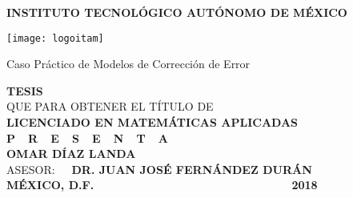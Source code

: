 \begin{titlepage}
    \begin{center}
        
        \vspace{0.2cm}

        \large
        \textbf{INSTITUTO TECNOL\'OGICO AUT\'ONOMO DE M\'EXICO}

        \vspace{1.2cm}
        
        \texttt{[image: logoitam]}
        
        \vspace{0.8cm}
        \LARGE
        Caso Práctico de Modelos de Corrección de Error
        
        \vspace{1.1cm}
        
        \normalsize \textbf{TESIS}\\ QUE PARA OBTENER EL T\'ITULO DE\\ \textbf{LICENCIADO EN MATEM\'ATICAS APLICADAS}\\[0.8cm]
        \normalsize \textbf{P\ \  R\ \  E\ \  S\ \  E\ \  N\ \  T\ \  A}\\[0.8cm]

        \textbf{OMAR D\'IAZ LANDA}\\[1.0cm]

        \normalsize ASESOR: \textbf{\ \ DR. JUAN JOSÉ FERN\'ANDEZ DUR\'AN}\\[1.0cm]

        \normalsize \textbf{M\'EXICO, D.F.} {\ \ \ \ \ \ \ \ \ \ \ \ \ \ \ \ \ \ \ \ \ \ \ \ \ \ \ \ \ \ \ \ \ \ } \textbf{2018}
    \end{center}
\end{titlepage}